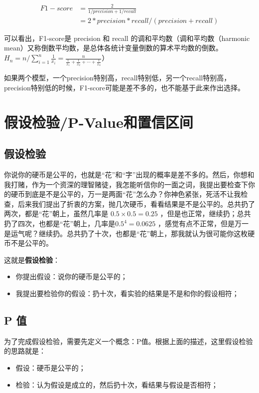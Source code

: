 \documentclass[12pt]{article}
\begin{document}
\begin{align*}
F1-score &= \frac{2}{1/precision + 1/recall}\\
     &= 2 * precision * recall / (precision + recall) 
\end{align*}

可以看出，F1-score是 precision 和 recall 的调和平均数（调和平均数（harmonic mean）又称倒数平均数，是总体各统计变量倒数的算术平均数的倒数。$H_n = n/\sum_{i=1}^n\frac{1}{x_i} = \frac{n}{\frac{1}{x_1} + \frac{1}{x_2} + \cdots + \frac{1}{x_n}}$）

如果两个模型，一个precision特别高，recall特别低，另一个recall特别高，precision特别低的时候，F1-score可能是差不多的，也不能基于此来作出选择。

\section{假设检验/P-Value和置信区间\cite{P_Value_In_Statistics_Hypothesis}\cite{How_To_Understand_95_Confidential}}
\subsection{假设检验}
你说你的硬币是公平的，也就是“花”和“字”出现的概率是差不多的。然后，你想和我打赌，作为一个资深的理智赌徒，我怎能听信你的一面之词，我提出要检查下你的硬币到底是不是公平的，万一是两面“花”怎么办？你神色紧张，死活不让我检查，后来我们提出了折衷的方案，抛几次硬币，看看结果是不是公平的。总共扔了两次，都是“花”朝上，虽然几率是 $0.5 \times 0.5 = 0.25$ ，但是也正常，继续扔；总共扔了四次，也都是“花”朝上，几率是$0.5^4 = 0.0625$ ，感觉有点不正常，但是万一是运气呢？继续扔。总共扔了十次，也都是“花”朝上，那我就认为很可能你这枚硬币不是公平的。

这就是\textbf{假设检验}：
\begin{itemize}
\setlength{\itemsep}{0pt}
\setlength{\parsep}{0pt}
\setlength{\parskip}{0pt}
    \item 你提出假设：说你的硬币是公平的；
    \item 我提出要检验你的假设：扔十次，看实验的结果是不是和你的假设相符；
\end{itemize}

\subsection{P 值}
为了完成假设检验，需要先定义一个概念：P值。根据上面的描述，这里假设检验的思路就是：
\begin{itemize}
\setlength{\itemsep}{0pt}
\setlength{\parsep}{0pt}
\setlength{\parskip}{0pt}
    \item 假设：硬币是公平的；
    \item 检验：认为假设是成立的，然后扔十次，看结果与假设是否相符；
\end{itemize}
\end{document}
